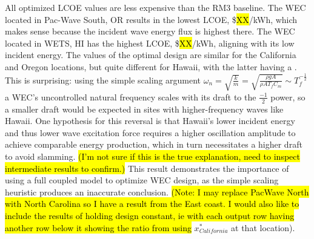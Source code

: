 All optimized LCOE values are less expensive than the RM3 baseline.
The WEC located in Pac-Wave South, OR results in the lowest LCOE, \$\hl{XX}/kWh, which makes sense because the incident wave energy flux is highest there.
The WEC located in WETS, HI has the highest LCOE, \$\hl{XX}/kWh, aligning with its low incident energy.
The values of the optimal design are similar for the California and Oregon locations, but quite different for Hawaii, with the latter having a \HawaiiDesignCharacteristics.
This is surprising: using the simple scaling argument $\omega_n = \sqrt{\frac{k}{m}}=\sqrt{\frac{\rho g A}{\rho A T_f C_m}}\sim T_f^{-\frac{1}{2}}$ a WEC's uncontrolled natural frequency scales with its draft to the $\frac{-1}{2}$ power, so a smaller draft would be expected in sites with higher-frequency waves like Hawaii.
One hypothesis for this reversal is that Hawaii's lower incident energy and thus lower wave excitation force requires a higher oscillation amplitude to achieve comparable energy production, which in turn necessitates a higher draft to avoid slamming.
\hl{(I'm not sure if this is the true explanation, need to inspect intermediate results to confirm.)}
This result demonstrates the importance of using a full coupled model to optimize WEC design, as the simple scaling heuristic produces an inaccurate conclusion.
\hl{(Note: I may replace PacWave North with North Carolina so I have a result from the East coast.
I would also like to include the results of holding design constant, ie with each output row having another row below it showing the ratio from using} $x^*_{California}$ at that location).


